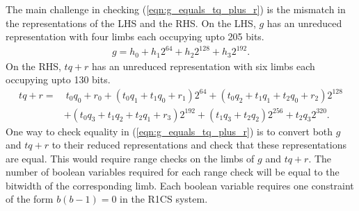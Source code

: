 \documentclass[a4paper, 12pt]{article}
\begin{document}
The main challenge in checking (\ref{eqn:g_equals_tq_plus_r}) is the mismatch in the representations of the LHS and the RHS. On the LHS, $g$ has an unreduced representation with four limbs each occupying upto 205 bits.
\begin{align*}
   g = h_0 + h_1 2^{64} + h_2 2^{128} + h_3 2^{192}.
\end{align*}
On the RHS, $tq+r$ has an unreduced representation with six limbs each occupying upto 130 bits.
\begin{align*}
  tq+r  =&\ t_0q_0+r_0 + (t_0q_1 + t_1q_0 + r_1) 2^{64} + (t_0q_2 + t_1q_1 + t_2q_0 + r_2) 2^{128}\\
  & + (t_0q_3 + t_1q_2 + t_2q_1 + r_3) 2^{192}+ (t_1q_3 + t_2q_2) 2^{256} + t_2q_3 2^{320}.
\end{align*}
One way to check equality in (\ref{eqn:g_equals_tq_plus_r}) is to convert both $g$ and $tq+r$ to their reduced representations and check that these representations are equal. This would require range checks on the limbs of $g$ and $tq+r$. The number of boolean variables required for each range check will be equal to the bitwidth of the corresponding limb. Each boolean variable requires one constraint of the form $b(b-1) = 0$ in the R1CS system.
\end{document}
